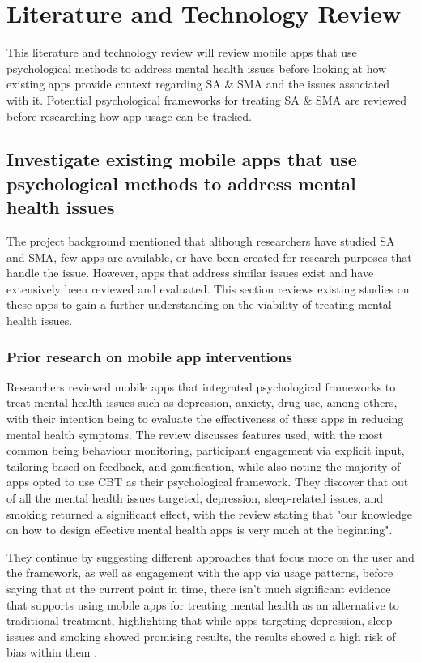 \documentclass[12pt]{article}
\begin{document}
\newpage



\section{Literature and Technology Review}
This literature and technology review will review mobile apps that use psychological methods to address mental 
health issues before looking at how existing apps provide context regarding SA \& SMA and
the issues associated with it. Potential psychological frameworks for treating SA \& SMA are reviewed 
before researching how app usage can be tracked.

\subsection{Investigate existing mobile apps that use psychological methods to address mental health issues}
The project background mentioned that although researchers have studied SA and SMA, few apps are available, 
or have been created for research purposes that handle the issue. However, apps that address similar 
issues exist and have extensively been reviewed and evaluated. This section reviews existing
studies on these apps to gain a further understanding on the viability of treating mental health issues.

\subsubsection{Prior research on mobile app interventions}
Researchers \textcite{RefWorks:RefID:87-weisel2019standalone} reviewed mobile apps that integrated
psychological frameworks to treat mental health issues such as depression, anxiety,
drug use, among others, with their intention being to evaluate the 
effectiveness of these apps in reducing mental health symptoms. The review discusses features used, 
with the most common being behaviour monitoring, participant engagement via explicit input, tailoring based on 
feedback, 
and gamification, while also noting the majority of apps opted to use CBT as their psychological framework.
They discover that out of all the mental health issues targeted, depression, sleep-related 
issues, and smoking returned a significant effect, with the review stating that "our knowledge on how to design 
effective mental health apps is very much at the beginning". \newline

They continue by suggesting different approaches that focus more on the user and the framework, as well as 
engagement with the app via usage patterns,
before saying that at the current point in time, there isn't much significant evidence 
that supports using mobile apps for treating mental health as an alternative to traditional treatment, highlighting that
while apps targeting depression, sleep issues and smoking showed promising results, the results showed a high
risk of bias within them \autocite{RefWorks:RefID:87-weisel2019standalone}. \newline
\end{document}
